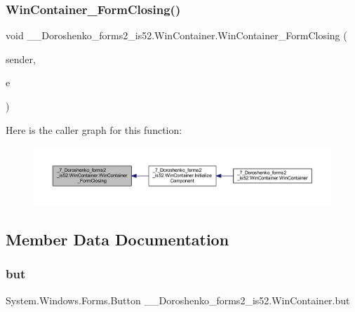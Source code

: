 \subsubsection{\texorpdfstring{Win\+Container\+\_\+\+Form\+Closing()}{WinContainer\_FormClosing()}}
{\footnotesize\ttfamily void \+\_\+\_\+\+Doroshenko\+\_\+forms2\+\_\+is52.\+Win\+Container.\+Win\+Container\+\_\+\+Form\+Closing (\begin{DoxyParamCaption}\item[{object}]{sender,  }\item[{Form\+Closing\+Event\+Args}]{e }\end{DoxyParamCaption})\hspace{0.3cm}{\ttfamily [private]}}

Here is the caller graph for this function\+:
\nopagebreak
\begin{figure}[H]
\begin{center}
\leavevmode
\includegraphics[width=350pt]{class__7___doroshenko__forms2__is52_1_1_win_container_af271aa1fe9946ebf1459cc9b90d07307_icgraph}
\end{center}
\end{figure}


\subsection{Member Data Documentation}
\hypertarget{class__7___doroshenko__forms2__is52_1_1_win_container_a2b516032e496a3f233e89d24f4c6d996}{}\label{class__7___doroshenko__forms2__is52_1_1_win_container_a2b516032e496a3f233e89d24f4c6d996} 
\subsubsection{\texorpdfstring{but}{but}}
{\footnotesize\ttfamily System.\+Windows.\+Forms.\+Button \+\_\+\_\+\+Doroshenko\+\_\+forms2\+\_\+is52.\+Win\+Container.\+but\hspace{0.3cm}{\ttfamily [private]}}

